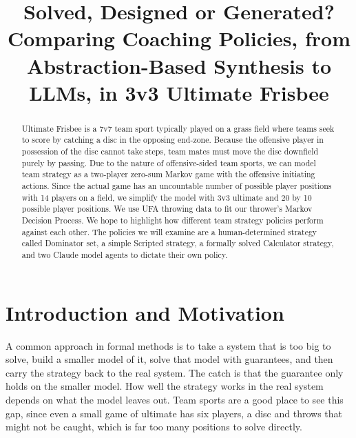 \documentclass[conference]{IEEEtran}
\begin{document}
\title{Solved, Designed or Generated? Comparing Coaching Policies, from Abstraction-Based Synthesis to LLMs, in 3v3 Ultimate Frisbee}

\author{
\and
{}
}

\maketitle

\begin{abstract}
Ultimate Frisbee is a 7v7 team sport typically played on a grass field where teams seek to score by catching a disc in the opposing end-zone. Because the offensive player in possession of the disc cannot take steps, team mates must move the disc downfield purely by passing. Due to the nature of offensive-sided team sports, we can model team strategy as a two-player zero-sum Markov game with the offensive initiating actions. Since the actual game has an uncountable number of possible player positions with 14 players on a field, we simplify the model with 3v3 ultimate and 20 by 10 possible player positions. We use UFA throwing data to fit our thrower's Markov Decision Process. We hope to highlight how different team strategy policies perform against each other. The policies we will examine are a human-determined strategy called Dominator set, a simple Scripted strategy, a formally solved Calculator strategy, and two Claude model agents to dictate their own policy.
\end{abstract}

\section{Introduction and Motivation}
A common approach in formal methods is to take a system that is too big to solve, build a smaller model of it, solve that model with guarantees, and then carry the strategy back to the real system. The catch is that the guarantee only holds on the smaller model. How well the strategy works in the real system depends on what the model leaves out. Team sports are a good place to see this gap, since even a small game of ultimate has six players, a disc and throws that might not be caught, which is far too many positions to solve directly.
\end{document}
